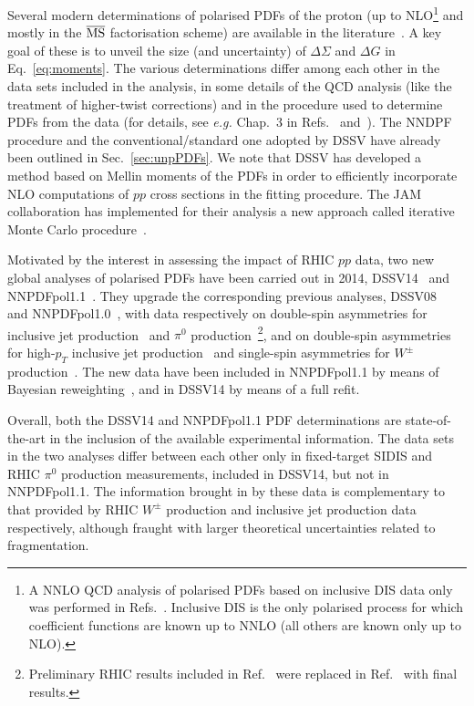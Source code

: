 Several modern determinations of polarised PDFs of the proton (up to 
NLO\footnote{A NNLO QCD analysis of polarised PDFs based on inclusive DIS
data only was performed in Refs.~\cite{Shahri:2016uzl,Khanpour:2017cha}.
Inclusive DIS is the only polarised process for which coefficient functions
are known up to NNLO (all others are known only up to NLO).} 
and mostly in the $\overline{\rm MS}$ factorisation scheme) are available in 
the literature~\cite{Nocera:2014gqa,Nocera:2016xhb,deFlorian:2014yva,deFlorian:2008mr,deFlorian:2009vb,Sato:2016tuz,Leader:2010rb,Blumlein:2010rn,Bourrely:2014uha,Hirai:2008aj}. 
%
A key goal of these is to unveil the size (and uncertainty) of
$\Delta\Sigma$ and  $\Delta G$ in Eq.~\eqref{eq:moments}. 
%
The various determinations differ among each other in the data sets included 
in the analysis, in some details of the QCD analysis (like the treatment of 
higher-twist corrections) and in the procedure used to determine PDFs from the 
data (for details, see {\it e.g.} Chap.~3 in Refs.~\cite{Nocera:2014vla} 
and~\cite{Nocera:2016xhb}). 
%
The NNDPF procedure and the conventional/standard one adopted by DSSV have 
already been outlined in Sec.~\ref{sec:unpPDFs}. 
%
We note that DSSV has developed a method based on Mellin moments of the PDFs 
in order to efficiently incorporate NLO computations
of $pp$ cross sections in the fitting procedure. 
%
The JAM collaboration has implemented for their analysis a new approach called 
iterative Monte Carlo procedure~\cite{Sato:2016tuz}. 

Motivated by the interest in assessing the impact of RHIC $pp$ 
data, two new global analyses of polarised PDFs have been carried out in
2014, DSSV14~\cite{deFlorian:2014yva} and NNPDFpol1.1~\cite{Nocera:2014gqa}.
%
They upgrade the corresponding previous analyses, 
DSSV08~\cite{deFlorian:2008mr,deFlorian:2009vb} and 
NNPDFpol1.0~\cite{Ball:2013lla}, with data respectively on double-spin 
asymmetries for inclusive jet production~\cite{Adamczyk:2014ozi} 
and $\pi^0$ production~\cite{Adare:2014hsq}\footnote{Preliminary RHIC results 
included in Ref.~\cite{deFlorian:2008mr} were replaced in
Ref.~\cite{deFlorian:2014yva} with final results.}, 
and on double-spin asymmetries for high-$p_T$ inclusive jet 
production~\cite{Adamczyk:2014ozi,Adamczyk:2012qj,Adare:2010cc} and single-spin
asymmetries for $W^\pm$ production~\cite{Adamczyk:2014xyw}.
%
The new data have been included in NNPDFpol1.1 
by means of Bayesian reweighting~\cite{Ball:2010gb},
and in DSSV14 by means of a full refit.  

Overall, both the DSSV14 and NNPDFpol1.1 PDF determinations are 
state-of-the-art in the inclusion of the available experimental information. 
%
The data sets in the two analyses differ between each other only in
fixed-target SIDIS and RHIC $\pi^0$ production measurements, included in 
DSSV14, but not in NNPDFpol1.1. 
%
The information brought in by these data is complementary to that provided by 
RHIC $W^\pm$ production and inclusive jet production data respectively,
although fraught with larger theoretical uncertainties related to fragmentation.

